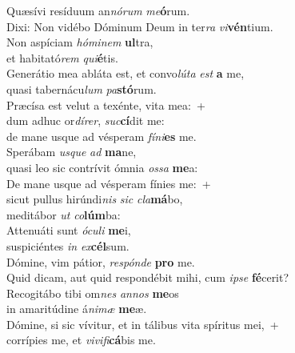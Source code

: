 \evenverse Quæsívi resíduum an\textit{nó}\textit{rum} \textit{me}\textbf{ó}rum.~\*\\
\evenverse Dixi: Non vidébo Dóminum Deum in ter\textit{ra} \textit{vi}\textbf{vén}tium.\\
\oddverse Non aspíciam \textit{hó}\textit{mi}\textit{nem} \textbf{ul}tra,~\*\\
\oddverse et habitató\textit{rem} \textit{qui}\textbf{é}tis.\\
\evenverse Generátio mea abláta est, et convo\textit{lú}\textit{ta} \textit{est} \textbf{a} me,~\*\\
\evenverse quasi tabernácu\textit{lum} \textit{pa}\textbf{stó}rum.\\
\oddverse Præcísa est velut a texénte, vita mea:~+\\
\oddverse  dum adhuc or\textit{dí}\textit{rer}, \textit{suc}\textbf{cí}dit me:~\*\\
\oddverse de mane usque ad vésperam \textit{fí}\textit{ni}\textbf{es} me.\\
\evenverse Sperábam \textit{us}\textit{que} \textit{ad} \textbf{ma}ne,~\*\\
\evenverse quasi leo sic contrívit ómnia \textit{os}\textit{sa} \textbf{me}a:\\
\oddverse De mane usque ad vésperam fínies me:~+\\
\oddverse  sicut pullus hirúndi\textit{nis} \textit{sic} \textit{cla}\textbf{má}bo,~\*\\
\oddverse meditábor \textit{ut} \textit{co}\textbf{lúm}ba:\\
\evenverse Attenuáti sunt \textit{ó}\textit{cu}\textit{li} \textbf{me}i,~\*\\
\evenverse suspiciéntes \textit{in} \textit{ex}\textbf{cél}sum.\\
\oddverse Dómine, vim pátior, \textit{re}\textit{spón}\textit{de} \textbf{pro} me.~\*\\
\oddverse Quid dicam, aut quid respondébit mihi, cum \textit{i}\textit{pse} \textbf{fé}cerit?\\
\evenverse Recogitábo tibi om\textit{nes} \textit{an}\textit{nos} \textbf{me}os~\*\\
\evenverse in amaritúdine á\textit{ni}\textit{mæ} \textbf{me}æ.\\
\oddverse Dómine, si sic vívitur, et in tálibus vita spíritus mei,~+\\
\oddverse  corrípies me, et \textit{vi}\textit{vi}\textit{fi}\textbf{cá}bis me.~\*\\
